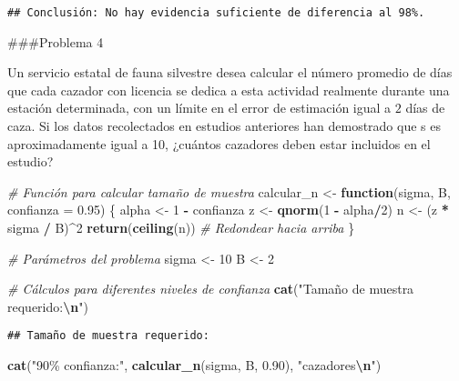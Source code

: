 \documentclass[
]{article}
\newenvironment{Shaded}{\begin{snugshade}}{\end{snugshade}}
\newcommand{\AttributeTok}[1]{\textcolor[rgb]{0.13,0.29,0.53}{#1}}
\newcommand{\CommentTok}[1]{\textcolor[rgb]{0.56,0.35,0.01}{\textit{#1}}}
\newcommand{\ControlFlowTok}[1]{\textcolor[rgb]{0.13,0.29,0.53}{\textbf{#1}}}
\newcommand{\DecValTok}[1]{\textcolor[rgb]{0.00,0.00,0.81}{#1}}
\newcommand{\FloatTok}[1]{\textcolor[rgb]{0.00,0.00,0.81}{#1}}
\newcommand{\FunctionTok}[1]{\textcolor[rgb]{0.13,0.29,0.53}{\textbf{#1}}}
\newcommand{\NormalTok}[1]{#1}
\newcommand{\OtherTok}[1]{\textcolor[rgb]{0.56,0.35,0.01}{#1}}
\newcommand{\SpecialCharTok}[1]{\textcolor[rgb]{0.81,0.36,0.00}{\textbf{#1}}}
\newcommand{\StringTok}[1]{\textcolor[rgb]{0.31,0.60,0.02}{#1}}
\begin{document}
\begin{verbatim}
## Conclusión: No hay evidencia suficiente de diferencia al 98%.
\end{verbatim}

\#\#\#Problema 4

Un servicio estatal de fauna silvestre desea calcular el número promedio
de días que cada cazador con licencia se dedica a esta actividad
realmente durante una estación determinada, con un límite en el error de
estimación igual a \(2\) días de caza. Si los datos recolectados en
estudios anteriores han demostrado que s es aproximadamente igual a 10,
¿cuántos cazadores deben estar incluidos en el estudio?

\begin{Shaded}
\begin{Highlighting}[]
\CommentTok{\# Función para calcular tamaño de muestra}
\NormalTok{calcular\_n }\OtherTok{\textless{}{-}} \ControlFlowTok{function}\NormalTok{(sigma, B, }\AttributeTok{confianza =} \FloatTok{0.95}\NormalTok{) \{}
\NormalTok{  alpha }\OtherTok{\textless{}{-}} \DecValTok{1} \SpecialCharTok{{-}}\NormalTok{ confianza}
\NormalTok{  z }\OtherTok{\textless{}{-}} \FunctionTok{qnorm}\NormalTok{(}\DecValTok{1} \SpecialCharTok{{-}}\NormalTok{ alpha}\SpecialCharTok{/}\DecValTok{2}\NormalTok{)}
\NormalTok{  n }\OtherTok{\textless{}{-}}\NormalTok{ (z }\SpecialCharTok{*}\NormalTok{ sigma }\SpecialCharTok{/}\NormalTok{ B)}\SpecialCharTok{\^{}}\DecValTok{2}
  \FunctionTok{return}\NormalTok{(}\FunctionTok{ceiling}\NormalTok{(n))  }\CommentTok{\# Redondear hacia arriba}
\NormalTok{\}}

\CommentTok{\# Parámetros del problema}
\NormalTok{sigma }\OtherTok{\textless{}{-}} \DecValTok{10}
\NormalTok{B }\OtherTok{\textless{}{-}} \DecValTok{2}

\CommentTok{\# Cálculos para diferentes niveles de confianza}
\FunctionTok{cat}\NormalTok{(}\StringTok{"Tamaño de muestra requerido:}\SpecialCharTok{\textbackslash{}n}\StringTok{"}\NormalTok{)}
\end{Highlighting}
\end{Shaded}

\begin{verbatim}
## Tamaño de muestra requerido:
\end{verbatim}

\begin{Shaded}
\begin{Highlighting}[]
\FunctionTok{cat}\NormalTok{(}\StringTok{"90\% confianza:"}\NormalTok{, }\FunctionTok{calcular\_n}\NormalTok{(sigma, B, }\FloatTok{0.90}\NormalTok{), }\StringTok{"cazadores}\SpecialCharTok{\textbackslash{}n}\StringTok{"}\NormalTok{)}
\end{Highlighting}
\end{Shaded}
\end{document}
